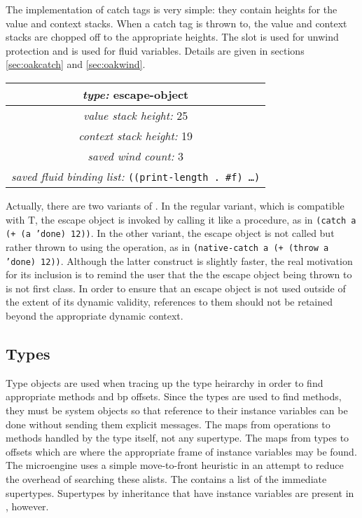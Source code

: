 The implementation of catch tags is very simple: they contain heights
for the value and context stacks.  When a catch tag is thrown to, the
value and context stacks are chopped off to the appropriate heights.
The slot  is used for unwind protection and
 is used for fluid variables.  Details
are given in sections \ref{sec:oakcatch} and \ref{sec:oakwind}.

\begin{center}
\begin{tabular}{|c|}\hline
\emph{type:} escape-object \\\hline
\emph{value stack height:} 25 \\\hline
\emph{context stack height:} 19 \\\hline
\emph{saved wind count:} 3 \\\hline
\emph{saved fluid binding list:} \tt ((print-length . \#f) \ldots)\\\hline
\end{tabular}
\end{center}

Actually, there are two variants of .  In the regular
variant, which is compatible with T, the escape object is invoked by
calling it like a procedure, as in \texttt{(catch a (+ (a 'done) 12))}.
In the other variant, the escape object is not called but rather
thrown to using the  operation, as in \texttt{(native-catch a
(+ (throw a 'done) 12))}.  Although the latter construct is slightly
faster, the real motivation for its inclusion is to remind the user
that the the escape object being thrown to is not first class.  In
order to ensure that an escape object is not used outside of the
extent of its dynamic validity, references to them should not be
retained beyond the appropriate dynamic context.

\subsection{Types}

Type objects are used when tracing up the type heirarchy in order to
find appropriate methods and bp offsets.  Since the types are used to
find methods, they must be system objects so that reference to their
instance variables can be done without sending them explicit messages.
The  maps from operations to methods
handled by the type itself, not any supertype.  The 
maps from types to offsets which are where the appropriate frame of
instance variables may be found.  The microengine uses a simple
move-to-front heuristic in an attempt to reduce the overhead of
searching these alists.  The  contains a list of
the immediate supertypes.  Supertypes by inheritance that have
instance variables are present in , however.

